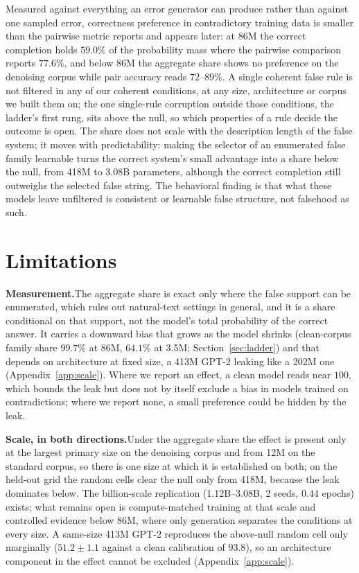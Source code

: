 \documentclass{article}
\begin{document}
Measured against everything an error generator can produce rather than against one sampled error, correctness preference in contradictory training data is smaller than the pairwise metric reports and appears later: at 86M the correct completion holds $59.0\%$ of the probability mass where the pairwise comparison reports $77.6\%$, and below 86M the aggregate share shows no preference on the denoising corpus while pair accuracy reads $72$--$89\%$. A single coherent false rule is not filtered in any of our coherent conditions, at any size, architecture or corpus we built them on; the one single-rule corruption outside those conditions, the ladder's first rung, sits above the null, so which properties of a rule decide the outcome is open. The share does not scale with the description length of the false system; it moves with predictability: making the selector of an enumerated false family learnable turns the correct system's small advantage into a share below the null, from 418M to 3.08B parameters, although the correct completion still outweighs the selected false string. The behavioral finding is that what these models leave unfiltered is consistent or learnable false structure, not falsehood as such.

\section*{Limitations}

\textbf{Measurement.}\quad The aggregate share is exact only where the false support can be enumerated, which rules out natural-text settings in general, and it is a share conditional on that support, not the model's total probability of the correct answer. It carries a downward bias that grows as the model shrinks (clean-corpus family share $99.7\%$ at 86M, $64.1\%$ at 3.5M; Section~\ref{sec:ladder}) and that depends on architecture at fixed size, a 413M GPT-2 leaking like a 202M one (Appendix~\ref{app:scale}). Where we report an effect, a clean model reads near $100$, which bounds the leak but does not by itself exclude a bias in models trained on contradictions; where we report none, a small preference could be hidden by the leak.

\textbf{Scale, in both directions.}\quad Under the aggregate share the effect is present only at the largest primary size on the denoising corpus and from 12M on the standard corpus, so there is one size at which it is established on both; on the held-out grid the random cells clear the null only from 418M, because the leak dominates below. The billion-scale replication (1.12B--3.08B, 2 seeds, $0.44$ epochs) exists; what remains open is compute-matched training at that scale and controlled evidence below 86M, where only generation separates the conditions at every size. A same-size 413M GPT-2 reproduces the above-null random cell only marginally ($51.2 \pm 1.1$ against a clean calibration of $93.8$), so an architecture component in the effect cannot be excluded (Appendix~\ref{app:scale}).
\end{document}
